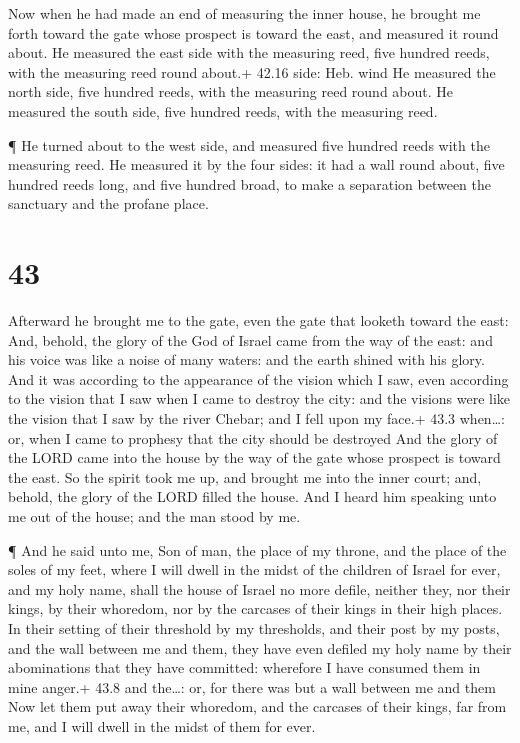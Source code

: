  Now when he had made an end of measuring the inner house,
he brought me forth toward the gate whose prospect is toward the east,
and measured it round about.  He measured the east side
with the measuring reed, five hundred reeds, with the measuring reed
round about.+ 42.16 side: Heb. wind  He measured the north
side, five hundred reeds, with the measuring reed round about.
 He measured the south side, five hundred reeds, with the
measuring reed.

 ¶ He turned about to the west side, and measured five
hundred reeds with the measuring reed.  He measured it by
the four sides: it had a wall round about, five hundred reeds long, and
five hundred broad, to make a separation between the sanctuary and the
profane place.

\hypertarget{section-42}{%
\section{43}\label{section-42}}

 Afterward he brought me to the gate, even the gate that
looketh toward the east:  And, behold, the glory of the God
of Israel came from the way of the east: and his voice was like a noise
of many waters: and the earth shined with his glory.  And it
was according to the appearance of the vision which I saw, even
according to the vision that I saw when I came to destroy the city: and
the visions were like the vision that I saw by the river Chebar; and I
fell upon my face.+ 43.3 when\ldots: or, when I came to prophesy that
the city should be destroyed  And the glory of the LORD came
into the house by the way of the gate whose prospect is toward the east.
 So the spirit took me up, and brought me into the inner
court; and, behold, the glory of the LORD filled the house. 
And I heard him speaking unto me out of the house; and the man stood by
me.

 ¶ And he said unto me, Son of man, the place of my throne,
and the place of the soles of my feet, where I will dwell in the midst
of the children of Israel for ever, and my holy name, shall the house of
Israel no more defile, neither they, nor their kings, by their whoredom,
nor by the carcases of their kings in their high places.  In
their setting of their threshold by my thresholds, and their post by my
posts, and the wall between me and them, they have even defiled my holy
name by their abominations that they have committed: wherefore I have
consumed them in mine anger.+ 43.8 and the\ldots: or, for there was but
a wall between me and them  Now let them put away their
whoredom, and the carcases of their kings, far from me, and I will dwell
in the midst of them for ever.

